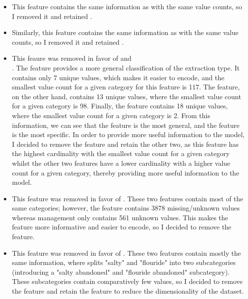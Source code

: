 \documentclass{article}
\begin{document}
\begin{itemize}
  \item {} This feature contains the same information as  with the same value counts, so I removed it and retained .
  \item {} Similarly, this feature contains the same information as  with the same value counts, so I removed it and retained .
  \item {} This feaure was removed in favor of  and \\ . The  feature provides a more general classification of the extraction type. It contains only 7 unique values, which makes it easier to encode, and the smallest value count for a given category for this feature is 117. The  feature, on the other hand, contains 13 unique values, where the smallest value count for a given category is 98. Finally, the  feature contains 18 unique values, where the smallest value count for a given category is 2. From this information, we can see that the  feature is the most general, and the  feature is the most specific. In order to provide more useful information to the model, I decided to remove the  feature and retain the other two, as this feature has the highest cardinality with the smallest value count for a given category whilst the other two features have a lower cardinality with a higher value count for a given category, thereby providing more useful information to the model.
  \item {} This feature was removed in favor of . These two features contain most of the same categories; however, the  feature contains 3878 missing/unknown values whereas management only contains 561 unknown values. This makes the  feature more informative and easier to encode, so I decided to remove the  feature.
  \item {} This feature was removed in favor of . These two features contain mostly the same information, where  splits "salty" and "flouride" into two subcategories (introducing a "salty abandoned" and "flouride abandoned" subcategory). These subcategories contain comparatively few values, so I decided to remove the  feature and retain the  feature to reduce the dimensionality of the dataset.

\end{itemize}
\end{document}
